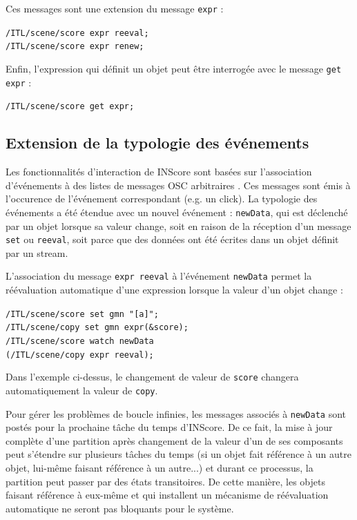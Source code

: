 \documentclass{article}
\newcommand{\OSC}[1]{\texttt{#1}}
\newcommand{\sample}	[1]			{\vspace{-0.2em}\begin{center}\colorbox{mygrey}{\begin{minipage}[t]{0.97\columnwidth} {\small \texttt{#1}}\end{minipage}}\end{center}}
\begin{document}
Ces messages sont une extension du message \OSC{expr} :
\sample{/ITL/scene/score expr reeval; \\
/ITL/scene/score expr renew;
}

Enfin, l'expression qui définit un objet peut être interrogée avec le message \OSC{get expr} :
\sample{/ITL/scene/score get expr;}

\subsection{Extension de la typologie des événements}
\label{exprEvents}

Les fonctionnalités d'interaction de INScore sont basées sur l'association d'événements à des listes de messages OSC arbitraires \cite{Fober:13b}. Ces messages sont émis à l'occurence de l'événement correspondant (e.g. un click).
La typologie des événements a été étendue avec un nouvel événement : \OSC{newData}, qui est déclenché par un objet lorsque sa valeur change, soit en raison de la réception d'un message \OSC{set} ou \OSC{reeval}, soit parce que des données ont été écrites dans un objet définit par un stream.

L'association du message \OSC{expr reeval} à l'événement \OSC{newData} permet la réévaluation automatique d'une expression lorsque la valeur d'un objet change :
\sample{/ITL/scene/score set gmn "[a]";\\
/ITL/scene/copy set gmn expr(\&score);\\
/ITL/scene/score watch newData\\   
\hspace*{8mm}(/ITL/scene/copy expr reeval);
}

Dans l'exemple ci-dessus, le changement de valeur de \OSC{score} changera automatiquement la valeur de \OSC{copy}.

Pour gérer les problèmes de boucle infinies, les messages associés à \OSC{newData} sont postés pour la prochaine tâche du temps d'INScore. De ce fait, la mise à jour complète d'une partition après changement de la valeur d'un de ses composants peut s'étendre sur plusieurs tâches du temps (si un objet fait référence à un autre objet, lui-même faisant référence à un autre...) et durant ce processus, la partition peut passer par des états transitoires. De cette manière, les objets faisant référence à eux-même et qui installent un mécanisme de réévaluation automatique ne seront pas bloquants pour le système.
\end{document}
